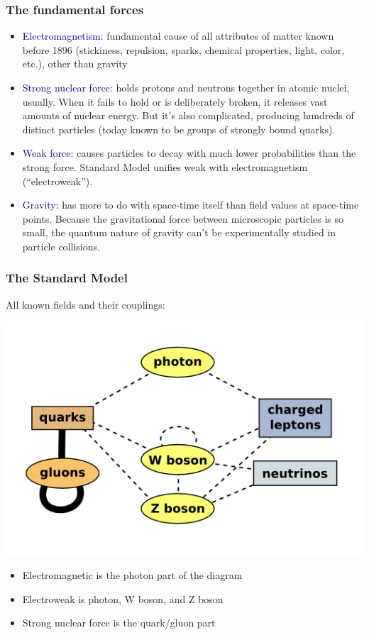 \documentclass[compress]{beamer}
\begin{document}
\begin{frame}
\frametitle{The fundamental forces}
\begin{itemize}\setlength{\itemsep}{0.2 cm}
\item<1-> \textcolor{darkblue}{Electromagnetism:} fundamental cause of all
  attributes of matter known before 1896 (stickiness, repulsion,
  sparks, chemical properties, light, color, etc.), other than
  gravity

\item<2-> \textcolor{darkblue}{Strong nuclear force:} holds protons and
  neutrons together in atomic nuclei, usually.  When it fails to hold
  or is deliberately broken, it releases vast amounts of nuclear
  energy.  But it's also complicated, producing hundreds of distinct
  particles (today known to be groups of strongly bound quarks).

\item<3-> \textcolor{darkblue}{Weak force:} causes particles to decay with
  much lower probabilities than the strong force.  Standard Model
  unifies weak with electromagnetism (``electroweak'').

\item<4> \textcolor{darkblue}{Gravity:} has more to do with space-time
  itself than field values at space-time points.  Because the
  gravitational force between microscopic particles is so small, the
  quantum nature of gravity can't be experimentally studied in
  particle collisions.
\end{itemize}
\end{frame}

\begin{frame}
\frametitle{The Standard Model}

All known fields and their couplings:
\begin{center}
\includegraphics[width=0.6\linewidth]{standard_model.png}
\end{center}

\begin{itemize}
\item Electromagnetic is the photon part of the diagram
\item Electroweak is photon, W boson, and Z boson
\item Strong nuclear force is the quark/gluon part
\end{itemize}
\end{frame}
\end{document}
